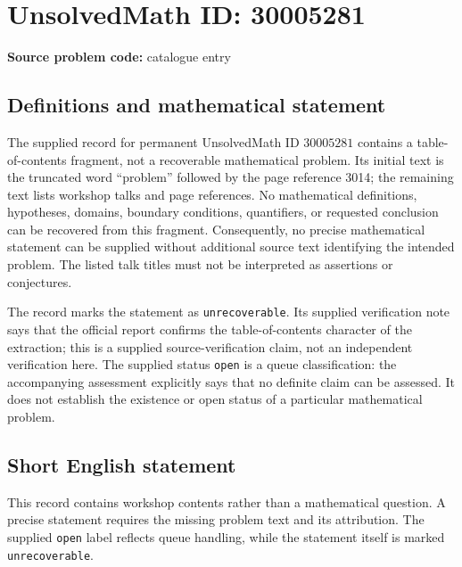 \documentclass[11pt]{article}
\begin{document}
\section*{UnsolvedMath ID: 30005281}
\textbf{Source problem code:} catalogue entry
\subsection{Definitions and mathematical statement}
The supplied record for permanent UnsolvedMath ID \(30005281\) contains a table-of-contents fragment, not a recoverable mathematical problem. Its initial text is the truncated word ``problem'' followed by the page reference 3014; the remaining text lists workshop talks and page references. No mathematical definitions, hypotheses, domains, boundary conditions, quantifiers, or requested conclusion can be recovered from this fragment. Consequently, no precise mathematical statement can be supplied without additional source text identifying the intended problem. The listed talk titles must not be interpreted as assertions or conjectures.

The record marks the statement as \texttt{unrecoverable}. Its supplied verification note says that the official report confirms the table-of-contents character of the extraction; this is a supplied source-verification claim, not an independent verification here. The supplied status \texttt{open} is a queue classification: the accompanying assessment explicitly says that no definite claim can be assessed. It does not establish the existence or open status of a particular mathematical problem.
\subsection{Short English statement}
This record contains workshop contents rather than a mathematical question. A precise statement requires the missing problem text and its attribution. The supplied \texttt{open} label reflects queue handling, while the statement itself is marked \texttt{unrecoverable}.
\end{document}

